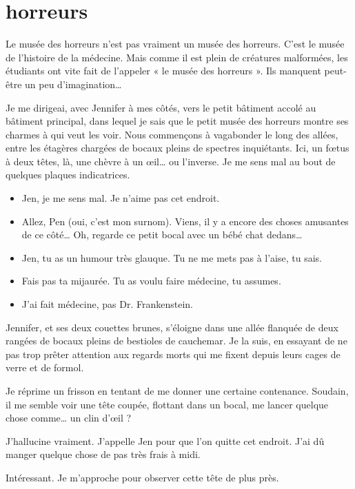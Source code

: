 \section{horreurs}

Le musée des horreurs n'est pas vraiment un musée des horreurs. C'est le musée de l'histoire de la médecine. Mais comme il est plein de créatures malformées, les étudiants ont vite fait de l'appeler « le musée des horreurs ». Ils manquent peut-être un peu d'imagination…

Je me dirigeai, avec Jennifer à mes côtés, vers le petit bâtiment accolé au bâtiment principal, dans lequel je sais que le petit musée des horreurs montre ses charmes à qui veut les voir. Nous commençons à vagabonder le long des allées, entre les étagères chargées de bocaux pleins de spectres inquiétants. Ici, un fœtus à deux têtes, là, une chèvre à un œil… ou l'inverse. Je me sens mal au bout de quelques plaques indicatrices.

\begin{itemize}
\item Jen, je me sens mal. Je n'aime pas cet endroit.
\item Allez, Pen (oui, c'est mon surnom). Viens, il y a encore des choses amusantes de ce côté… Oh, regarde ce petit bocal avec un bébé chat dedans…
\item Jen, tu as un humour très glauque. Tu ne me mets pas à l'aise, tu sais.
\item Fais pas ta mijaurée. Tu as voulu faire médecine, tu assumes.
\item J'ai fait médecine, pas Dr. Frankenstein.
\end{itemize}

Jennifer, et ses deux couettes brunes, s'éloigne dans une allée flanquée de deux rangées de bocaux pleins de bestioles de cauchemar. Je la suis, en essayant de ne pas trop prêter attention aux regards morts qui me fixent depuis leurs cages de verre et de formol.

Je réprime un frisson en tentant de me donner une certaine contenance. Soudain, il me semble voir une tête coupée, flottant dans un bocal, me lancer quelque chose comme… un clin d'œil ?

\item J'hallucine vraiment. J'appelle Jen pour que l'on quitte cet endroit. J'ai dû manger quelque chose de pas très frais à midi.
\item Intéressant. Je m'approche pour observer cette tête de plus près. 
\enw

